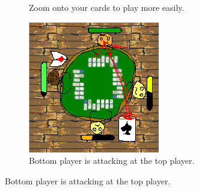 \documentclass[a4paper,10pt,english]{article}
\begin{document}
\begin{figure}[h]
\begin{subfigure}{0.29\linewidth}
\caption{Zoom onto your cards to play more easily.}
\label{Fig:Style1B}
\end{subfigure}\hfill
%
\begin{subfigure}{0.29\linewidth}
\includegraphics[width=\linewidth]{solitairebr3.png}
\caption{Bottom player is attacking at the top player.}
\label{Fig:Style1C}
\end{subfigure}

\end{figure}
\end{document}
